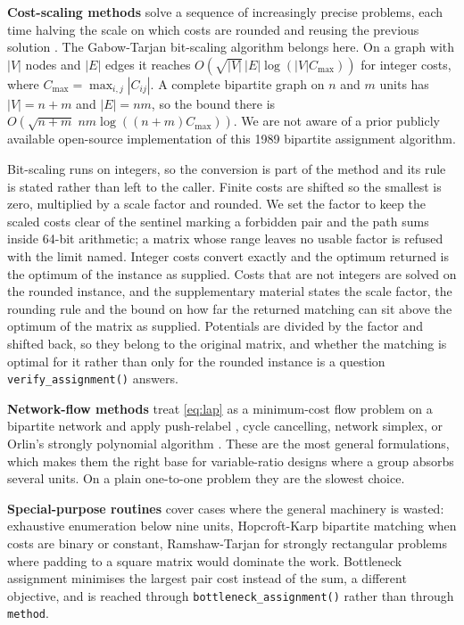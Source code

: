 \textbf{Cost-scaling methods} solve a sequence of increasingly precise problems,
each time halving the scale on which costs are rounded and reusing the previous
solution \citep{GoldbergKennedy1995}. The Gabow-Tarjan bit-scaling algorithm
\citep{GabowTarjan1989} belongs here. On a graph with \(|V|\) nodes and \(|E|\) edges it
reaches \(O(\sqrt{|V|}\, |E| \log(|V| C_{\max}))\) for integer costs, where
\(C_{\max} = \max_{i,j} |C_{ij}|\). A complete bipartite graph on \(n\) and \(m\) units
has \(|V| = n + m\) and \(|E| = nm\), so the bound there is
\(O(\sqrt{n + m}\; nm \log((n + m) C_{\max}))\).
We are not aware of a prior publicly available open-source implementation of
this 1989 bipartite assignment algorithm.

Bit-scaling runs on integers, so the conversion is part of the method and its
rule is stated rather than left to the caller. Finite costs are shifted so the
smallest is zero, multiplied by a scale factor and rounded. We set the factor to keep the scaled costs clear of the sentinel marking a forbidden pair and the
path sums inside 64-bit arithmetic; a matrix whose range leaves no usable
factor is refused with the limit named. Integer costs convert exactly and the
optimum returned is the optimum of the instance as supplied. Costs that are not
integers are solved on the rounded instance, and the supplementary material
states the scale factor, the rounding rule and the bound on how far the
returned matching can sit above the optimum of the matrix as supplied.
Potentials are divided by the factor and shifted back, so they belong to the
original matrix, and whether the matching is optimal for it rather than only
for the rounded instance is a question \texttt{verify\_assignment()} answers.

\textbf{Network-flow methods} treat \eqref{eq:lap} as a minimum-cost flow problem on a
bipartite network \citep{Ahuja1993} and apply push-relabel \citep{GoldbergTarjan1988},
cycle cancelling, network simplex, or Orlin's strongly polynomial algorithm
\citep{Orlin1993}. These are the most general formulations, which makes them the
right base for variable-ratio designs where a group absorbs several units. On a
plain one-to-one problem they are the slowest choice.

\textbf{Special-purpose routines} cover cases where the general machinery is wasted:
exhaustive enumeration below nine units, Hopcroft-Karp bipartite matching
\citep{HopcroftKarp1973} when costs are binary or constant, Ramshaw-Tarjan
\citep{RamshawTarjan2012} for strongly rectangular problems where padding to a square
matrix would dominate the work. Bottleneck assignment minimises the largest
pair cost instead of the sum, a different objective, and is reached through
\texttt{bottleneck\_assignment()} rather than through \texttt{method}.


